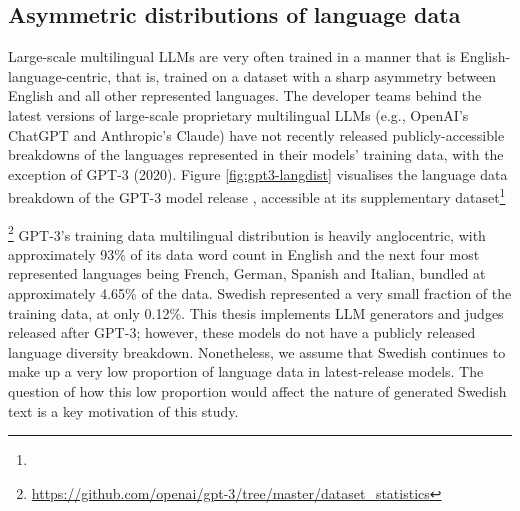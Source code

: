\documentclass[thesis]{cluu}
\providecommand{\DIFadd}[1]{\texorpdfstring{\highLight[yellow]{#1}}{#1}} %
\providecommand{\DIFadd}[1]{#1} %
\providecommand{\DIFdel}[1]{} %
\providecommand{\DIFaddbegin}{} %
\providecommand{\DIFaddend}{} %
\providecommand{\DIFdelbegin}{} %
\providecommand{\DIFdelend}{} %
\begin{document}
\subsection{Asymmetric distributions of language data}
Large-scale multilingual LLMs are very often trained in a manner that is English-language-centric, that is, trained on a dataset with a sharp asymmetry between English and all other represented languages. The developer teams behind the latest versions of large-scale proprietary multilingual LLMs (e.g., OpenAI's ChatGPT and Anthropic's Claude) have not recently released publicly-accessible breakdowns of the languages represented in their models' training data, with the exception of GPT-3 (2020). Figure \ref{fig:gpt3-langdist} visualises the language data breakdown of the GPT-3 model release \parencite{brown2020language}, accessible at its supplementary dataset\DIFdelbegin \footnote{\DIFdel{https://github.com/openai/gpt-3/tree/master/dataset\_statistics}}%
\addtocounter{footnote}{-1}%
\DIFdel{.}\DIFdelend \DIFaddbegin \DIFadd{.}\footnote{\url{https://github.com/openai/gpt-3/tree/master/dataset_statistics}} \DIFaddend GPT-3's training data multilingual distribution is heavily anglocentric, with approximately 93\% of its data word count in English and the next four most represented languages being French, German, Spanish and Italian, bundled at approximately 4.65\% of the data. Swedish represented a very small fraction of the training data, at only 0.12\%. This thesis implements LLM generators and judges released after GPT-3; however, these models do not have a publicly released language diversity breakdown. Nonetheless, we assume that Swedish continues to make up a very low proportion of language data in latest-release models. The question of how this low proportion would affect the nature of generated Swedish text is a key motivation of this study.

\end{document}
